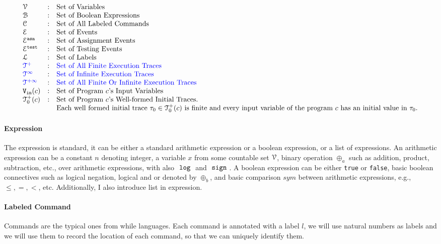 \[
\begin{array}{lll}
\vardom & : & \mbox{Set of Variables}  
\\ 
%
\booldom & : & \mbox{Set of Boolean Expressions}  
\\ 
%
\cdom & : & \mbox{Set of All Labeled Commands} 
\\ 
%
\eventset  & : & \mbox{Set of Events}  
\\
%
\eventset^{\asn}  & : & \mbox{Set of Assignment Events}  
\\
%
\eventset^{\test}  & : & \mbox{Set of Testing Events}  
\\
%
\ldom  & : & \mbox{Set of Labels}  
\\
%
\highlight{\ftdom} & : & \mbox{\highlight{Set of All Finite Execution Traces}}
\\
\highlight{\inftdom} & : & \mbox{\highlight{Set of Infinite  Execution Traces}}
\\
\highlight{\tdom} & : & \mbox{\highlight{Set of All Finite Or Infinite  Execution Traces}}
\\ 
%
\inpvar(c) & : & \mbox{Set of Program $c$'s Input Variables}  
\\
%
\ftdom_0(c) & : & \mbox{Set of Program $c$'s Well-formed Initial Traces.}
\\ & & \mbox{Each well formed initial trace $\trace_0 \in \ftdom_0(c)$ is finite and every input variable of the program $c$ has an initial value in $\trace_0$.}
\end{array}
\]
%
\paragraph{Expression}
The expression is standard, it can be
either a standard arithmetic expression or a boolean expression, or a list of expressions.
An arithmetic expression can be a constant $n$ denoting integer, a variable $x$ from some countable set $\mathcal{V}$, binary operation $\oplus_a$ such as addition, product, subtraction, etc., over arithmetic expressions, with also $~\mathtt{log}~$ and $~\mathtt{sign}~$. 
%
A boolean expression can be either {\tt true} or {\tt false}, basic boolean connectives such as logical negation, logical and or denoted by $\oplus_b$, and basic comparison $sym$ between arithmetic expressions, e.g., $\leq, =, <$, etc.
Additionally, I also introduce list in expression.

\paragraph{Labeled Command}
Commands are the typical ones from while languages. Each command is annotated with a label $l$, we will use natural numbers as labels and we will use them to record
the location of each command, so that we can uniquely identify them.

